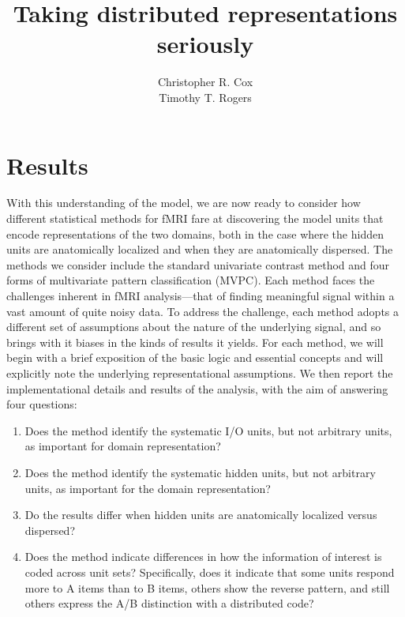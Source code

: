 \documentclass[12pt,man]{apa6}
\title{Taking distributed representations seriously}
\author{Christopher R. Cox\\Timothy T. Rogers}
\affiliation{University of Wisconsin, Madison}
\begin{document}
\maketitle







\section{Results}

With this understanding of the model, we are now ready to consider how different statistical methods for fMRI fare at discovering the model units that encode representations of the two domains, both in the case where the hidden units are anatomically localized and when they are anatomically dispersed. The methods we consider include the standard univariate contrast method and four forms of multivariate pattern classification (MVPC). Each method faces the challenges inherent in fMRI analysis---that of finding meaningful signal within a vast amount of quite noisy data. To address the challenge, each method adopts a different set of assumptions about the nature of the underlying signal, and so brings with it biases in the kinds of results it yields. For each method, we will begin with a brief exposition of the basic logic and essential concepts and will explicitly note the underlying representational assumptions. We then report the implementational details and results of the analysis, with the aim of answering four questions:

\begin{enumerate}
\item Does the method identify the systematic I/O units, but not arbitrary units, as important for domain representation?
\item Does the method identify the systematic hidden units, but not arbitrary units, as important for the domain representation?
\item Do the results differ when hidden units are anatomically localized versus dispersed?
\item Does the method indicate differences in how the information of interest is coded across unit sets? Specifically, does it indicate that some units respond more to A items than to B items, others show the reverse pattern, and still others express the A/B distinction with a distributed code? 
\end{enumerate}















%


\end{document}
